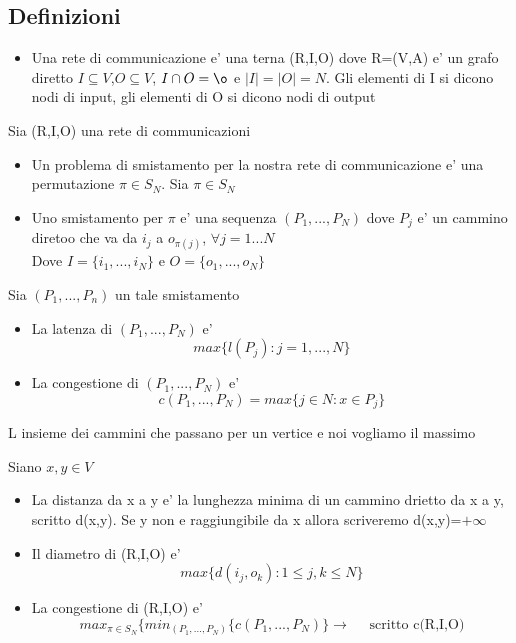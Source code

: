 \documentclass{article}
\begin{document}
        \subsection*{Definizioni}
        \begin{itemize}
          \item Una rete di communicazione e' una terna (R,I,O) dove R=(V,A) e' un grafo diretto
            $I \subseteq V$,$O\subseteq V$, $I \cap O =\o$ e $\mid I \mid =\mid O \mid=N$.
            Gli elementi di I si dicono nodi di input, gli elementi di O si dicono nodi di output
        \end{itemize}
        Sia (R,I,O) una rete di communicazioni
        \begin{itemize}
          \item Un problema di smistamento per la nostra rete di communicazione e' una permutazione $\pi \in S_N$. Sia $\pi \in S_N$
          \item Uno smistamento per $\pi$ e' una sequenza $(P_1,...,P_N)$ dove $P_j$ e' un cammino diretoo che va da $i_j$ a $o_{\pi(j)}$, $\forall j=1...N$ \\ 
            Dove $I=\{i_1,...,i_N\}$ e $O=\{o_1,...,o_N\}$
        \end{itemize}
        Sia $(P_1,...,P_n)$ un tale smistamento
        \begin{itemize}
          \item La latenza di $(P_1,...,P_N)$ e'
            \begin{equation*}
              max\{l(P_j):j=1,...,N\}
            \end{equation*}
          \item La congestione di $(P_1,...,P_N)$ e' 
            \begin{equation*}
              c(P_1,...,P_N)=max\{j\in N:x\in P_j\}
            \end{equation*}
        \end{itemize}
        \begin{flushleft}
          L insieme dei cammini che passano per un vertice e noi vogliamo il massimo
        \end{flushleft}
        Siano $x,y \in V$
        \begin{itemize}
          \item La distanza da x a y e' la lunghezza minima di un cammino drietto da x a y, scritto d(x,y). Se y non e raggiungibile da x allora scriveremo d(x,y)=$+\infty$
          \item Il diametro di (R,I,O) e'
            \begin{equation*}
              max\{d(i_j,o_k): 1\leq j,k\leq N\} 
            \end{equation*}
          \item La congestione di (R,I,O) e'
            \begin{equation*}
              max_{\pi \in S_N}\{min_{(P_1,...,P_N)}\{c(P_1,...,P_N)\} \to \quad \text{ scritto c(R,I,O)}
            \end{equation*}
        \end{itemize}
\end{document}
